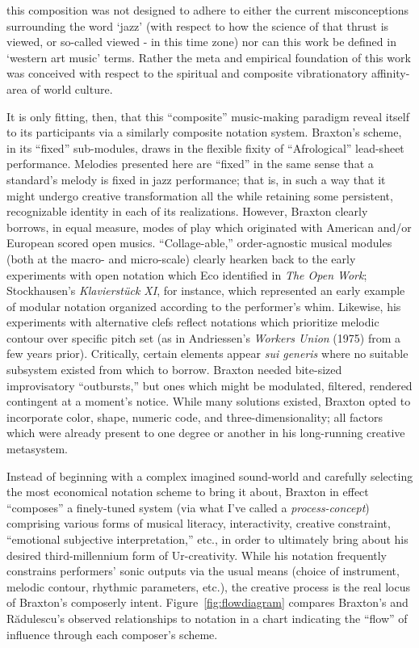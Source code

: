     \begin{smallquote}
        [...] this composition was not designed to adhere to either the current misconceptions surrounding the word `jazz' (with respect to how the science of that thrust is viewed, or so-called viewed - in this time zone) nor can this work be defined in `western art music' terms. Rather the meta and empirical foundation of this work was conceived with respect to the spiritual and composite vibrationatory affinity-area of world culture.\autocite[136--7]{Braxton_1988}
    \end{smallquote}

    It is only fitting, then, that this ``composite'' music-making paradigm reveal itself to its participants via a similarly composite notation system. Braxton's scheme, in its ``fixed'' sub-modules, draws in the flexible fixity of ``Afrological'' lead-sheet performance. Melodies presented here are ``fixed'' in the same sense that a standard's melody is fixed in jazz performance; that is, in such a way that it might undergo creative transformation all the while retaining some persistent, recognizable identity in each of its realizations. However, Braxton clearly borrows, in equal measure, modes of play which originated with American and/or European scored open musics. ``Collage-able,'' order-agnostic musical modules (both at the macro- and micro-scale) clearly hearken back to the early experiments with open notation which Eco identified in \textit{The Open Work}; Stockhausen's \textit{Klavierstück XI}, for instance, which represented an early example of modular notation organized according to the performer's whim.\autocite[1]{Eco_Robey_1989} Likewise, his experiments with alternative clefs reflect notations which prioritize melodic contour over specific pitch set (as in Andriessen's \textit{Workers Union} (1975) from a few years prior). Critically, certain elements appear \textit{sui generis} where no suitable subsystem existed from which to borrow. Braxton needed bite-sized improvisatory ``outbursts,'' but ones which might be modulated, filtered, rendered contingent at a moment's notice. While many solutions existed, Braxton opted to incorporate color, shape, numeric code, and three-dimensionality; all factors which were already present to one degree or another in his long-running creative metasystem.

    Instead of beginning with a complex imagined sound-world and carefully selecting the most economical notation scheme to bring it about, Braxton in effect ``composes'' a finely-tuned system (via what I've called a \textit{process-concept}) comprising various forms of musical literacy, interactivity, creative constraint, ``emotional subjective interpretation,'' etc., in order to ultimately bring about his desired third-millennium form of Ur-creativity. While his notation frequently constrains performers' sonic outputs via the usual means (choice of instrument, melodic contour, rhythmic parameters, etc.), the creative process is the real locus of Braxton's composerly intent. Figure~\ref{fig:flowdiagram} compares Braxton's and R\u{a}dulescu's observed relationships to notation in a chart indicating the ``flow'' of influence through each composer's scheme.
    
